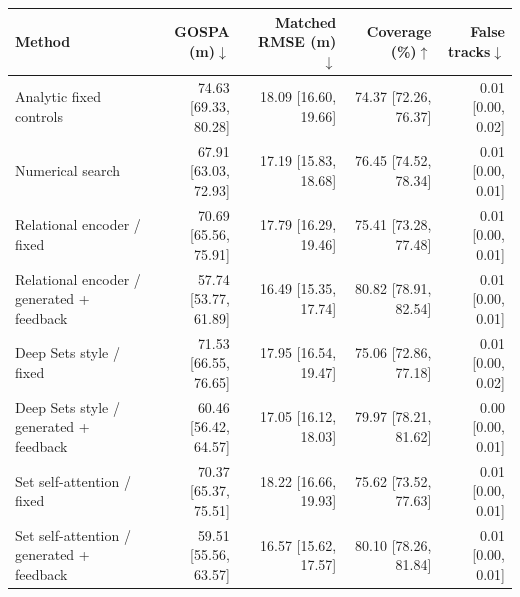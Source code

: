 \begin{tabular}{lrrrr}
\toprule
Method & GOSPA (m)$\downarrow$ & Matched RMSE (m)$\downarrow$ & Coverage (\%)$\uparrow$ & False tracks$\downarrow$ \\
\midrule
Analytic fixed controls & 74.63 [69.33, 80.28] & 18.09 [16.60, 19.66] & 74.37 [72.26, 76.37] & 0.01 [0.00, 0.02] \\
Numerical search & 67.91 [63.03, 72.93] & 17.19 [15.83, 18.68] & 76.45 [74.52, 78.34] & 0.01 [0.00, 0.01] \\
\midrule
Relational encoder / fixed & 70.69 [65.56, 75.91] & 17.79 [16.29, 19.46] & 75.41 [73.28, 77.48] & 0.01 [0.00, 0.01] \\
Relational encoder / generated + feedback & 57.74 [53.77, 61.89] & 16.49 [15.35, 17.74] & 80.82 [78.91, 82.54] & 0.01 [0.00, 0.01] \\
\midrule
Deep Sets style / fixed & 71.53 [66.55, 76.65] & 17.95 [16.54, 19.47] & 75.06 [72.86, 77.18] & 0.01 [0.00, 0.02] \\
Deep Sets style / generated + feedback & 60.46 [56.42, 64.57] & 17.05 [16.12, 18.03] & 79.97 [78.21, 81.62] & 0.00 [0.00, 0.01] \\
\midrule
Set self-attention / fixed & 70.37 [65.37, 75.51] & 18.22 [16.66, 19.93] & 75.62 [73.52, 77.63] & 0.01 [0.00, 0.01] \\
Set self-attention / generated + feedback & 59.51 [55.56, 63.57] & 16.57 [15.62, 17.57] & 80.10 [78.26, 81.84] & 0.01 [0.00, 0.01] \\
\bottomrule
\end{tabular}
